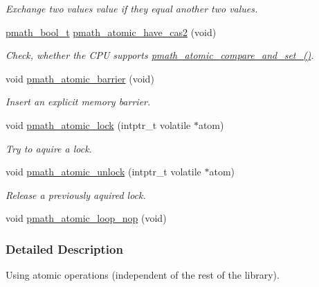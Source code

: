 \begin{CompactItemize}
\begin{CompactList}\small\item\em Exchange two values value if they equal another two values. \item\end{CompactList}\item 
\hyperlink{group__general__types_gc92090cb0b56345d6c379ed2341d4ef4}{pmath\_\-bool\_\-t} \hyperlink{group__atomic__ops_g9bc606e66ad7965f09dc9200f0b21bcc}{pmath\_\-atomic\_\-have\_\-cas2} (void)
\begin{CompactList}\small\item\em Check, whether the CPU supports \hyperlink{group__atomic__ops_g868adc2a74d7aafbb0670922f61a21cc}{pmath\_\-atomic\_\-compare\_\-and\_\-set\_()}. \item\end{CompactList}\item 
\hypertarget{group__atomic__ops_g7f23c95c69503003e2bda2ab6dc0aae4}{
void \hyperlink{group__atomic__ops_g7f23c95c69503003e2bda2ab6dc0aae4}{pmath\_\-atomic\_\-barrier} (void)}
\label{group__atomic__ops_g7f23c95c69503003e2bda2ab6dc0aae4}

\begin{CompactList}\small\item\em Insert an explicit memory barrier. \item\end{CompactList}\item 
void \hyperlink{group__atomic__ops_gf143a22332da6a2065bac14069ecbf7f}{pmath\_\-atomic\_\-lock} (intptr\_\-t volatile $\ast$atom)
\begin{CompactList}\small\item\em Try to aquire a lock. \item\end{CompactList}\item 
void \hyperlink{group__atomic__ops_ga61bbbab4adc550cc66d1d5f9cf22afd}{pmath\_\-atomic\_\-unlock} (intptr\_\-t volatile $\ast$atom)
\begin{CompactList}\small\item\em Release a previously aquired lock. \item\end{CompactList}\item 
void \hyperlink{group__atomic__ops_gf92920164c2e99abfbbe092dfc5dae86}{pmath\_\-atomic\_\-loop\_\-nop} (void)
\end{CompactItemize}


\subsubsection{Detailed Description}
Using atomic operations (independent of the rest of the library). 

